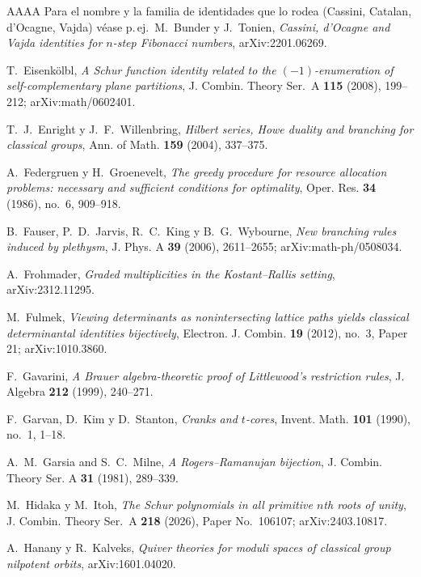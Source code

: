 \documentclass[11pt,reqno]{amsart}
\theoremstyle{plain}
\theoremstyle{definition}
\begin{document}
\begin{thebibliography}{AAAA}
 Para el nombre y la familia de identidades que lo rodea (Cassini, Catalan,
d'Ocagne, Vajda) véase p.\,ej.\ M.~Bunder y J.~Tonien, \emph{Cassini, d'Ocagne and Vajda identities
for $n$-step Fibonacci numbers}, arXiv:2201.06269.

 T.~Eisenk\"olbl, \emph{A Schur function identity related to the
$(-1)$-enumeration of self-complementary plane partitions}, J. Combin. Theory Ser.~A \textbf{115}
(2008), 199--212; arXiv:math/0602401.

 T.~J.~Enright y J.~F.~Willenbring, \emph{Hilbert series, Howe duality and
branching for classical groups}, Ann. of Math. \textbf{159} (2004), 337--375.

 A.~Federgruen y H.~Groenevelt, \emph{The greedy procedure for resource
allocation problems: necessary and sufficient conditions for optimality}, Oper. Res. \textbf{34}
(1986), no.~6, 909--918.

 B.~Fauser, P.~D.~Jarvis, R.~C.~King y B.~G.~Wybourne, \emph{New branching
rules induced by plethysm}, J. Phys. A \textbf{39} (2006), 2611--2655; arXiv:math-ph/0508034.

 A.~Frohmader, \emph{Graded multiplicities in the Kostant--Rallis
setting}, arXiv:2312.11295.

 M.~Fulmek, \emph{Viewing determinants as nonintersecting lattice
paths yields classical determinantal identities bijectively}, Electron. J. Combin. \textbf{19}
(2012), no.~3, Paper 21; arXiv:1010.3860.

 F.~Gavarini, \emph{A Brauer algebra-theoretic proof of Littlewood's
restriction rules}, J. Algebra \textbf{212} (1999), 240--271.

 F.~Garvan, D.~Kim y D.~Stanton, \emph{Cranks and $t$-cores},
Invent. Math. \textbf{101} (1990), no.~1, 1--18.

 A.~M.~Garsia and S.~C.~Milne, \emph{A Rogers--Ramanujan bijection},
J. Combin. Theory Ser. A \textbf{31} (1981), 289--339.

 M.~Hidaka y M.~Itoh, \emph{The Schur polynomials in all primitive $n$th roots
of unity}, J. Combin. Theory Ser.~A \textbf{218} (2026), Paper No.~106107; arXiv:2403.10817.

 A.~Hanany y R.~Kalveks, \emph{Quiver theories for moduli spaces of classical
group nilpotent orbits}, arXiv:1601.04020.


\end{thebibliography}
\end{document}
